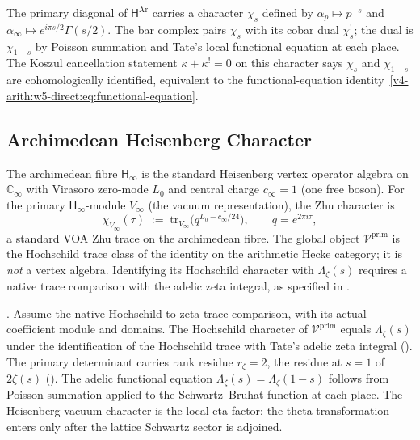\begin{remark}
\label{v4-arith:w5-direct:rem:P1-elementary}
The primary diagonal of \(\mathsf{H}^{\mathrm{Ar}}\) carries a character
\(\chi_{s}\) defined by \(\alpha_{p}\mapsto p^{-s}\) and
\(\alpha_{\infty}\mapsto e^{i\pi s/2}\Gamma(s/2)\). The bar complex
pairs \(\chi_{s}\) with its cobar dual \(\chi_{s}^{!}\); the dual is
\(\chi_{1-s}\) by Poisson summation and Tate's local functional
equation at each place. The Koszul cancellation statement
\(\kappa+\kappa^{!}=0\) on this character says \(\chi_{s}\) and
\(\chi_{1-s}\) are cohomologically identified, equivalent to the
functional-equation identity~\eqref{v4-arith:w5-direct:eq:functional-equation}.
\end{remark}

\subsection{Archimedean Heisenberg Character}
\label{v4-arith:w5-direct:step-2}

\begin{definition}
\label{v4-arith:w5-direct:def:zhu}
The archimedean fibre \(\mathsf{H}_{\infty}\) is the standard Heisenberg
vertex operator algebra on \(\mathbb{C}_{\infty}\) with Virasoro zero-mode
\(L_{0}\) and central charge \(c_{\infty}=1\) (one free boson). For the
primary \(\mathsf{H}_{\infty}\)-module \(V_{\infty}\) (the vacuum
representation), the Zhu character is
\begin{equation}
\label{v4-arith:w5-direct:eq:zhu-char}
\chi_{V_{\infty}}(\tau)\;:=\;\mathrm{tr}_{V_{\infty}}\bigl(q^{L_{0}-c_{\infty}/24}\bigr),
\qquad q=e^{2\pi i\tau},
\end{equation}
a standard VOA Zhu trace on the archimedean fibre. The global object
\(\mathcal{V}^{\mathrm{prim}}\) is the Hochschild trace class of the
identity on the arithmetic Hecke category; it is \emph{not} a vertex
algebra. Identifying its Hochschild character with \(\Lambda_{\zeta}(s)\)
requires a native trace comparison with the adelic zeta integral,
as specified in .
\end{definition}

\begin{theorem}
\label{v4-arith:w5-direct:thm:P2-elementary}
\ClaimStatusProvedHereConditional. Assume the native Hochschild-to-zeta
trace comparison, with its actual coefficient module and domains. The Hochschild character of
\(\mathcal{V}^{\mathrm{prim}}\) equals \(\Lambda_{\zeta}(s)\) under the
identification of the Hochschild trace with Tate's adelic zeta integral
(). The primary
determinant carries rank residue \(r_{\zeta}=2\), the residue at
\(s=1\) of \(2\zeta(s)\) (). The adelic
functional equation \(\Lambda_{\zeta}(s)=\Lambda_{\zeta}(1-s)\) follows
from Poisson summation applied to the Schwartz--Bruhat function at each
place.  The Heisenberg vacuum character is the local eta-factor; the
theta transformation enters only after the lattice Schwartz sector is
adjoined.
\end{theorem}


